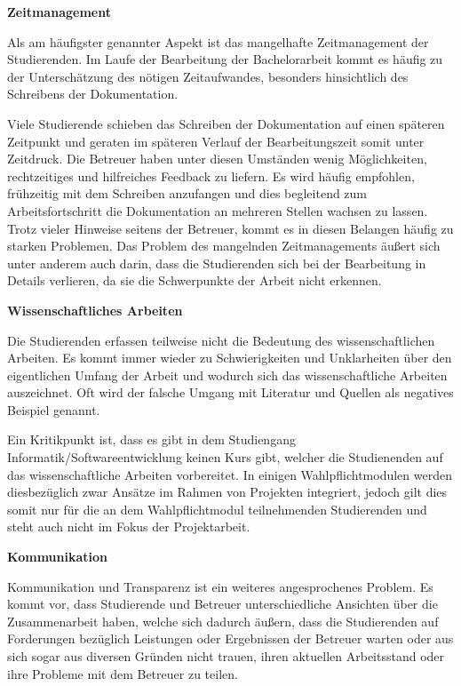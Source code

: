\documentclass[bibliography=totoc,listof=totoc,BCOR=5mm,DIV=12,oneside]{scrbook}
\begin{document}
\par \bigskip \textbf{Zeitmanagement}
\par Als am häufigster genannter Aspekt ist das mangelhafte Zeitmanagement der Studierenden. Im Laufe der Bearbeitung der Bachelorarbeit kommt es häufig zu der Unterschätzung des nötigen  Zeitaufwandes, besonders hinsichtlich des Schreibens der Dokumentation. 
\par Viele Studierende schieben das Schreiben der Dokumentation auf einen späteren Zeitpunkt und geraten im späteren Verlauf der Bearbeitungszeit somit unter Zeitdruck. Die Betreuer haben unter diesen Umständen wenig Möglichkeiten, rechtzeitiges und hilfreiches Feedback zu liefern. Es wird häufig empfohlen, frühzeitig mit dem Schreiben anzufangen und dies begleitend zum Arbeitsfortschritt die Dokumentation an mehreren Stellen wachsen zu lassen. Trotz vieler Hinweise seitens der Betreuer, kommt es in diesen Belangen häufig zu starken Problemen.
Das Problem des mangelnden Zeitmanagements äußert sich unter anderem auch darin, dass die Studierenden sich bei der Bearbeitung in Details verlieren, da sie die Schwerpunkte der Arbeit nicht erkennen.
\par \bigskip \textbf{Wissenschaftliches Arbeiten}
\par Die Studierenden erfassen teilweise nicht die Bedeutung des wissenschaftlichen Arbeiten. Es kommt immer wieder zu Schwierigkeiten und Unklarheiten über den eigentlichen Umfang der Arbeit und wodurch sich das wissenschaftliche Arbeiten auszeichnet. Oft wird der falsche Umgang mit Literatur und Quellen als negatives Beispiel genannt.
\par Ein Kritikpunkt ist, dass es gibt in dem Studiengang Informatik/Softwareentwicklung keinen Kurs gibt, welcher die Studienenden auf das wissenschaftliche Arbeiten vorbereitet. In einigen Wahlpflichtmodulen werden diesbezüglich zwar Ansätze im Rahmen von Projekten integriert, jedoch gilt dies somit nur für die an dem Wahlpflichtmodul teilnehmenden Studierenden und steht auch nicht im Fokus der Projektarbeit.
\par \bigskip \textbf{Kommunikation}
\par Kommunikation und Transparenz ist ein weiteres angesprochenes Problem. Es kommt vor, dass Studierende und Betreuer unterschiedliche Ansichten über die Zusammenarbeit haben, welche sich dadurch äußern, dass die Studierenden auf Forderungen bezüglich Leistungen oder Ergebnissen der Betreuer warten oder aus sich sogar aus diversen Gründen nicht trauen, ihren aktuellen Arbeitsstand oder ihre Probleme mit dem Betreuer zu teilen. 
\end{document}
